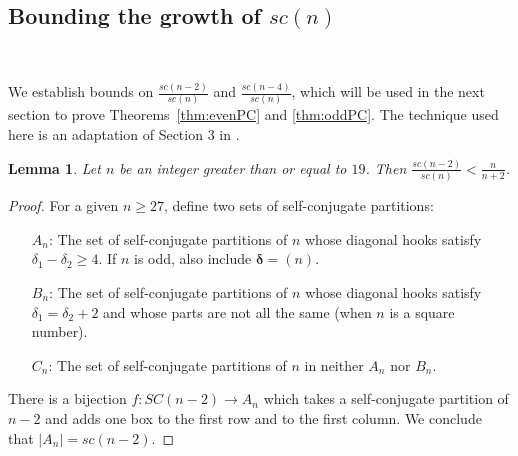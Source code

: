 \documentclass[12pt,leqno]{amsart}
\newtheorem{lem}{Lemma}[section]
\numberwithin{equation}{section}
\theoremstyle{definition}
\begin{document}
\subsection{Bounding the growth of $sc(n)$}\

We establish bounds on $\frac{sc(n-2)}{sc(n)}$ and $\frac{sc(n-4)}{sc(n)}$, which will be used in the next section to prove Theorems~\ref{thm:evenPC} and \ref{thm:oddPC}.  The technique used here is an adaptation of Section 3 in \cite{Craven}. 

\begin{lem}
Let $n$ be an integer greater than or equal to $19$.  Then $\frac{sc(n-2)}{sc(n)}< \frac{n}{n+2}$.
\label{lem:scn-2}
\end{lem}
\begin{proof}
For a given $n\geq 27$, define two sets of self-conjugate partitions:
\begin{itemize}
\item[$A_n$:] The set of self-conjugate partitions of $n$ whose diagonal hooks satisfy $\delta_1-\delta_2\geq 4$.  If $n$ is odd, also include $\boldsymbol\delta=(n)$.
\item[$B_n$:] The set of self-conjugate partitions of $n$ whose diagonal hooks satisfy $\delta_1=\delta_2+2$ and whose parts are not all the same (when $n$ is a square number).
\item[$C_n$:] The set of self-conjugate partitions of $n$ in neither $A_n$ nor $B_n$.
\end{itemize}

There is a bijection $f:SC(n-2) \rightarrow A_n$  which takes a self-conjugate partition of $n-2$ and adds one box to the first row and to the first column.  We conclude that $|A_n|=sc(n-2)$.


\end{proof}
\end{document}
